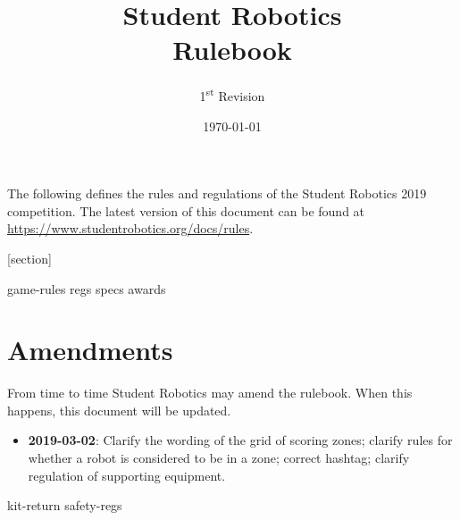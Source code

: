 \documentclass[a4paper, 11pt]{scrartcl}
\title {Student Robotics \sryear\\ Rulebook}
\author{1\textsuperscript{st} Revision}
\date{\today}
\newcommand{\sryear}{2019}
\begin{document}
\maketitle

\noindent The following defines the rules and regulations of the Student Robotics \sryear {} competition.  The latest version of this document can be found at \url{https://www.studentrobotics.org/docs/rules}.

[section]
\newcommand{\rcn}{\stepcounter{rule}\arabic{section}.\arabic{rule}}
\newcommand{\rcnappendix}{\stepcounter{rule}\Alph{section}.\arabic{rule}}
\renewcommand{\labelenumi}{\rcn}

 {game-rules}
\newpage
 {regs}
\newpage
 {specs}
\newpage
 {awards}

\renewcommand{\labelenumi}{\rcn}

\section{Amendments}
From time to time Student Robotics may amend the rulebook.  When this happens, this document will be updated.

\begin{itemize}
\item \textbf{2019-03-02}: Clarify the wording of the grid of scoring zones; clarify rules for whether a robot is considered to be in a zone; correct hashtag; clarify regulation of supporting equipment.
\end{itemize}

\newpage
\appendix
\renewcommand{\labelenumi}{\rcnappendix}
\appendixpage
\addappheadtotoc
 {kit-return}
 {safety-regs}
\end{document}
